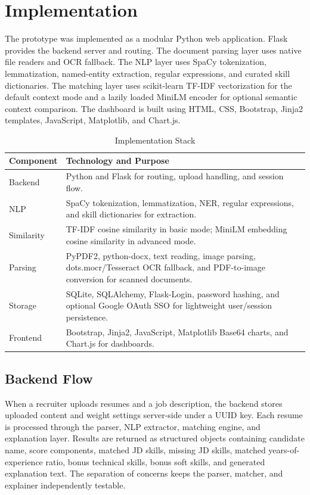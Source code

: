 \section{Implementation}
The prototype was implemented as a modular Python web application. Flask provides the backend server and routing. The document parsing layer uses native file readers and OCR fallback. The NLP layer uses SpaCy tokenization, lemmatization, named-entity extraction, regular expressions, and curated skill dictionaries. The matching layer uses scikit-learn TF-IDF vectorization for the default context mode and a lazily loaded MiniLM encoder for optional semantic context comparison. The dashboard is built using HTML, CSS, Bootstrap, Jinja2 templates, JavaScript, Matplotlib, and Chart.js.

\begin{table}[!ht]
\centering
\small
\begin{tabularx}{\columnwidth}{|p{}|Y|}
\hline
{}
\textbf{Component} & \textbf{Technology and Purpose}\\
\hline
Backend & Python and Flask for routing, upload handling, and session flow.\\
\hline
NLP & SpaCy tokenization, lemmatization, NER, regular expressions, and skill dictionaries for extraction.\\
\hline
Similarity & TF-IDF cosine similarity in basic mode; MiniLM embedding cosine similarity in advanced mode.\\
\hline
Parsing & PyPDF2, python-docx, text reading, image parsing, dots.mocr/Tesseract OCR fallback, and PDF-to-image conversion for scanned documents.\\
\hline
Storage & SQLite, SQLAlchemy, Flask-Login, password hashing, and optional Google OAuth SSO for lightweight user/session persistence.\\
\hline
Frontend & Bootstrap, Jinja2, JavaScript, Matplotlib Base64 charts, and Chart.js for dashboards.\\
\hline
\end{tabularx}
\caption{Implementation Stack}
\label{tab:stack}
\end{table}

\subsection{Backend Flow}
When a recruiter uploads resumes and a job description, the backend stores uploaded content and weight settings server-side under a UUID key. Each resume is processed through the parser, NLP extractor, matching engine, and explanation layer. Results are returned as structured objects containing candidate name, score components, matched JD skills, missing JD skills, matched years-of-experience ratio, bonus technical skills, bonus soft skills, and generated explanation text. The separation of concerns keeps the parser, matcher, and explainer independently testable.

